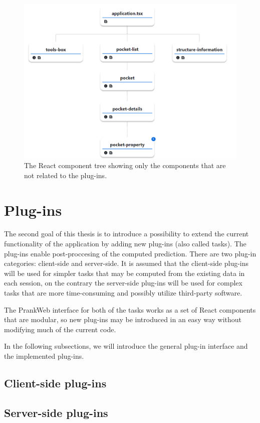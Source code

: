 \begin{figure}[htb]
    \centering
    \includegraphics[width=\textwidth]{img/react_molstar.pdf}
    \caption{The React component tree showing only the components that are not related to the plug-ins.}
    \label{fig:react-molstar}
\end{figure}

\section{Plug-ins}
\label{sec:plugins}

The second goal of this thesis is to introduce a possibility to extend the current functionality of the application by adding new plug-ins (also called tasks). The plug-ins enable post-proccesing of the computed prediction. There are two plug-in categories: client-side and server-side. It is assumed that the client-side plug-ins will be used for simpler tasks that may be computed from the existing data in each session, on the contrary the server-side plug-ins will be used for complex tasks that are more time-consuming and possibly utilize third-party software.

The PrankWeb interface for both of the tasks works as a set of React components that are modular, so new plug-ins may be introduced in an easy way without modifying much of the current code.

In the following subsections, we will introduce the general plug-in interface and the implemented plug-ins.

\subsection{Client-side plug-ins}

\subsection{Server-side plug-ins}
